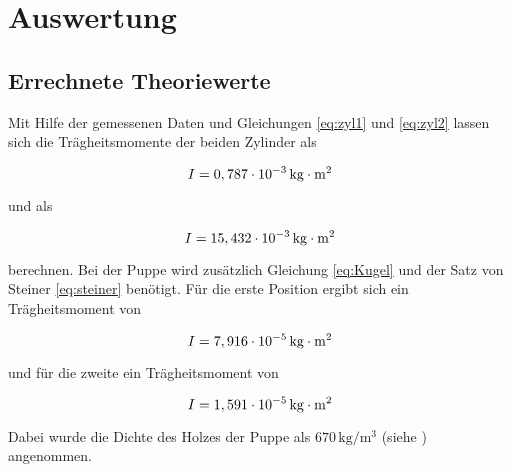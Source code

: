 \section{Auswertung}
\label{sec:Auswertung}

\subsection{Errechnete Theoriewerte}

Mit Hilfe der gemessenen Daten und Gleichungen \ref{eq:zyl1} und \ref{eq:zyl2}
lassen sich die Trägheitsmomente der beiden Zylinder
als

\begin{equation*}
  I=0,787 \cdot 10^{-3}\,\si[inter-unit-product=\cdot]{\kilo\gram\meter\squared}
\end{equation*}

\noindent und als

\begin{equation*}
  I=15,432 \cdot 10^{-3}\,\si[inter-unit-product=\cdot]{\kilo\gram\meter\squared}
\end{equation*}

\noindent berechnen. Bei der Puppe wird zusätzlich 
Gleichung \ref{eq:Kugel} und der Satz von Steiner \ref{eq:steiner}
benötigt. Für die erste Position ergibt sich ein
Trägheitsmoment von

\begin{equation*}
  I=7,916 \cdot 10^{-5}\,\si[inter-unit-product=\cdot]{\kilo\gram\meter\squared}
\end{equation*}

\noindent und für die zweite ein Trägheitsmoment von

\begin{equation*}
  I=1,591 \cdot 10^{-5}\,\si[inter-unit-product=\cdot]{\kilo\gram\meter\squared}
\end{equation*}

\noindent Dabei wurde die Dichte des Holzes der Puppe
als $670\,\si{\kilo\gram \per \cubic \meter}$ (siehe \cite{holz})
angenommen.
